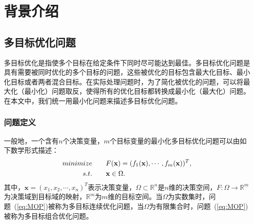 \chapter{背景介绍}
\label{chap:背景介绍}
\section{多目标优化问题}
\label{sec:背景介绍:多目标优化问题}
多目标优化是指使多个目标在给定条件下同时尽可能达到最佳。多目标优化问题是具有需要被同时优化的多个目标的问题，这些被优化的目标包含最大化目标、最小化目标或者两者混合目标。在实际处理问题时，为了简化被优化的问题，可以将最大化（最小化）问题取反，使得所有的优化目标都转换成最小化（最大化）问题。在本文中，我们统一用最小化问题来描述多目标优化问题。

\subsection{问题定义}
\label{subsec:背景介绍:多目标优化问题:问题定义}
一般地，一个含有$n$个决策变量，$m$个目标变量的最小化多目标优化问题可以由如下数学形式描述：
\begin{align}
    \label{eq:MOP}
    minimize \qquad & F(\mathbf{x}) = (f_1(\mathbf{x}), \cdots, f_m(\mathbf{x}))^T,  \\
    s.t. \qquad & \mathbf{x} \in \Omega. \notag
\end{align}
其中，$\mathbf{x} = (x_1, x_2, \cdots, x_n)^T$表示决策变量，$\Omega \subset \mathbb{R}^n$是$n$维的决策空间，$F: \Omega \rightarrow \mathbb{R}^m$为决策域到目标域的映射，$\mathbb{R}^m$为$m$维的目标空间。当$\Omega$为实数集时，问题~(\ref{eq:MOP})被称为多目标连续优化问题，当$\Omega$为有限集合时，问题~(\ref{eq:MOP})被称为多目标组合优化问题。

